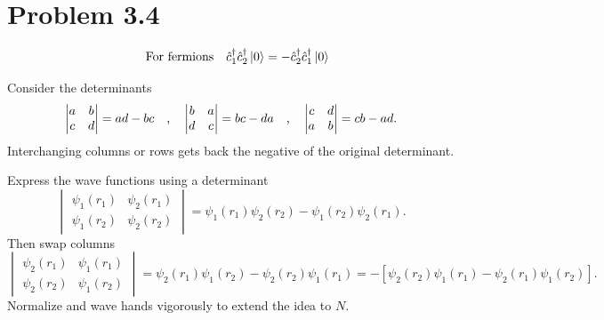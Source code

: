 \documentclass{amsart}
\begin{document}
\section*{Problem 3.4}
\[\qq{For fermions}\hat{c}^\dagger_1 \hat{c}^\dagger_2\ket{0}=-\hat{c}^\dagger_2 \hat{c}^\dagger_1\ket{0}  \]

Consider the determinants
\[
\begin{vmatrix} a & b \\ c & d \end{vmatrix}=ad-bc\qq{,} \begin{vmatrix} b & a \\ d & c \end{vmatrix}=bc-da\qq{,} \begin{vmatrix} c & d \\ a & b \end{vmatrix}=cb-ad.
\]
Interchanging columns or rows gets back the negative of the original determinant.

Express the wave functions using a determinant
\[
\begin{vmatrix} \psi_1(r_1) & \psi_2(r_1) \\ \psi_1(r_2) & \psi_2(r_2) \end{vmatrix}=\psi_1(r_1) \psi_2(r_2) -\psi_1(r_2) \psi_2(r_1).
\]
Then swap columns
\[
\begin{vmatrix}  \psi_2(r_1) & \psi_1(r_1)\\  \psi_2(r_2) & \psi_1(r_2)\end{vmatrix}= \psi_2(r_1)\psi_1(r_2)-\psi_2(r_2)\psi_1(r_1)=-[ \psi_2(r_2)\psi_1(r_1) - \psi_2(r_1)\psi_1(r_2)].
\]
Normalize and wave hands vigorously to extend the idea to $N$.


\end{document}
